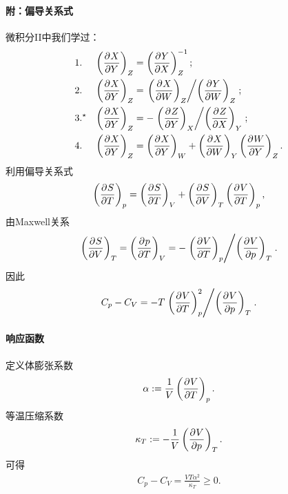 \paragraph{附：偏导关系式}
微积分II中我们学过：
\begin{align}
	 & 1.       & \kh{\pv XY}_Z & =\kh{\pv YX}_Z^{-1};                                             \\
	 & 2.       & \kh{\pv XY}_Z & =\dvd{\kh{\pv XW}_Z}{\kh{\pv YW}_Z};  \\
	 & 3.^\star & \kh{\pv XY}_Z & =-\dvd{\kh{\pv ZY}_X}{\kh{\pv ZX}_Y}; \\
	 & 4.       & \kh{\pv XY}_Z & =\kh{\pv XY}_W+\kh{\pv XW}_Y\kh{\pv WY}_Z.
\end{align}
\fi
利用偏导关系式
\begin{align*}
	\kh{\pv ST}_p=\kh{\pv ST}_V+\kh{\pv SV}_T\kh{\pv VT}_p,
\end{align*}
由Maxwell关系
\[
	\kh{\pv SV}_T=\kh{\pv pT}_V=-\dvd{\kh{\pv VT}_p}{\kh{\pv Vp}_T}.
\]
因此
\[
	C_p-C_V=-T\dvd{\kh{\pv VT}_p^2}{\kh{\pv Vp}_T}.
\]

\paragraph{响应函数}定义体膨张系数
\begin{align}
	\alpha:=\frac1V\kh{\pv VT}_p.
\end{align}
等温压缩系数
\begin{align}
	\kappa_T:=-\frac1V\kh{\pv Vp}_T.
\end{align}
可得
\begin{align}
	C_p-C_V=\frac{VT\alpha^2}{\kappa_T}\geqslant 0.
\end{align}